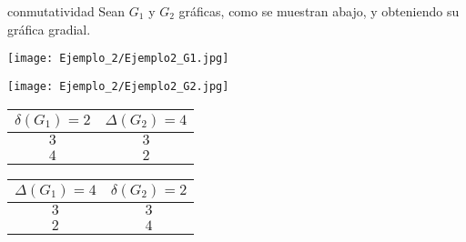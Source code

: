 \documentclass[fleqn, 11pt]{beamer}
\begin{document}
    \begin{ejemplo}[beforeafter skip = 4mm]{}{conmutatividad}
        Sean $ G_1 $ y $ G_2 $ gráficas, como se muestran abajo, y obteniendo su gráfica gradial.

        \begin{center}
            \begin{minipage}[h]{0.6\linewidth}
                \begin{minipage}[h]{0.45\linewidth}
                    \texttt{[image: Ejemplo\_2/Ejemplo2\_G1.jpg]}
                \end{minipage} 
                \begin{minipage}[h]{0.45\linewidth}
                    \texttt{[image: Ejemplo\_2/Ejemplo2\_G2.jpg]}
                \end{minipage} 
        
                \begin{minipage}[h]{0.45\linewidth}
                    \begin{tcolorbox}[title empty, colframe = black!99!white, colback = white, sharp corners, hbox, nobeforeafter, left = -0.9mm, right = -0.9mm, top = -0.9mm, bottom = -0.9mm]
                        \begin{tabular}{c|c}
                            \rowcolor{gray!36!white} 
                            $ \delta(G_1) = 2 $ & $ \Delta(G_2) = 4 $ \\ \hline\hline
                            $ 3 $               & $ 3 $ \\ \hline
                            $ 4 $               & $ 2 $
                        \end{tabular}
                    \end{tcolorbox}
                \end{minipage}
                \begin{minipage}[h]{0.45\linewidth}
                    \begin{tcolorbox}[title empty, colframe = black!99!white, colback = white, sharp corners, hbox, nobeforeafter, left = -0.9mm, right = -0.9mm, top = -0.9mm, bottom = -0.9mm]
                        \begin{tabular}{c|c}
                            \rowcolor{gray!36!white} 
                            $ \Delta(G_1) = 4 $ & $ \delta(G_2) = 2 $ \\ \hline\hline
                            $ 3 $               & $ 3 $ \\ \hline
                            $ 2 $               & $ 4 $
                        \end{tabular}
                    \end{tcolorbox}
                \end{minipage}
            \end{minipage}
            \begin{minipage}[h]{0.25\linewidth}
                \centering


\end{minipage}
\end{center}
\end{ejemplo}
\end{document}
